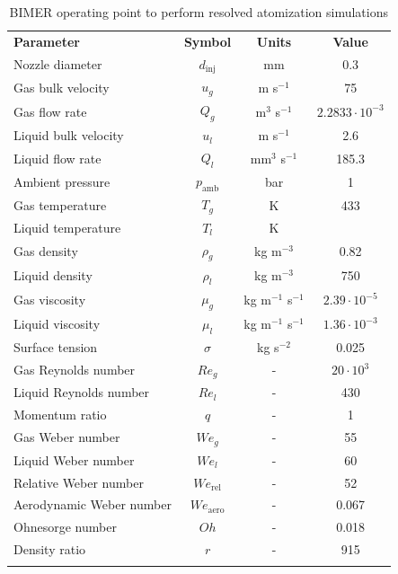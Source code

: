 \begin{table}[!h]
\centering
\caption{BIMER operating point to perform resolved atomization simulations}
\begin{tabular}{lccc}
\thickhline
\textbf{Parameter} & \textbf{Symbol} & \textbf{Units} &  \textbf{Value} \\
\thickhline
Nozzle diameter & $d_\mathrm{inj}$ & mm & 0.3 \\
Gas bulk velocity & $u_g$ & m s$^{-1}$ & 75 \\
Gas flow rate & $Q_g$ & m$^3$ s$^{-1}$ & $2.2833 \cdot 10^{-3}$   \\
Liquid bulk velocity & $u_l$ & m s$^{-1}$ & 2.6  \\
Liquid flow rate & $Q_l$ & mm$^3$ s$^{-1}$ & 185.3  \\
Ambient pressure & $p_\mathrm{amb}$ & bar &  1 \\
Gas temperature & $T_g$ & K & 433 \\
Liquid temperature & $T_l$ & K &  \\
Gas density & $\rho_g$ & kg m$^{-3}$ & 0.82 \\
Liquid density & $\rho_l$ & kg m$^{-3}$ & 750 \\
Gas viscosity & $\mu_g$ & kg m$^{-1}$ s$^{-1}$ & $2.39 \cdot 10^{-5}$ \\
Liquid viscosity & $\mu_l$ & kg m$^{-1}$ s$^{-1}$ &  $1.36 \cdot 10^{-3}$ \\
Surface tension & $\sigma$ & kg s$^{-2}$ &  0.025  \\
\thickhline
Gas Reynolds number & $Re_g$ & - & $20 \cdot 10^3$ \\ %
Liquid Reynolds number & $Re_l$ & - & 430 \\
Momentum ratio & $q$ & - & 1 \\ %
Gas Weber number & $We_g$ & - & 55 \\ %
Liquid Weber number & $We_l$ & - & 60 \\
Relative Weber number & $We_\mathrm{rel}$ & - & 52 \\ %
Aerodynamic Weber number & $We_\mathrm{aero}$ & - & 0.067 \\
Ohnesorge number & $Oh $ & - & 0.018 \\
Density ratio & $r$ & - & 915 \\
\thickhline
\end{tabular}
\label{tab:bimer_sps_operating_point}
\end{table}

